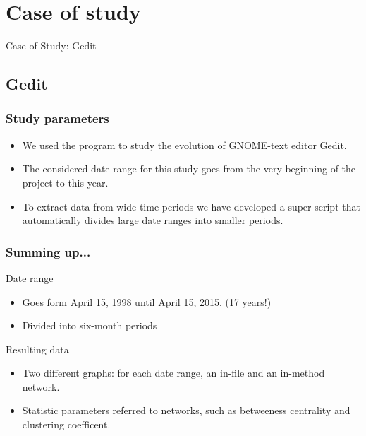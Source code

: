 \documentclass{beamer}
\begin{document}
\section{Case of study}
\begin{frame}
\Huge{\centerline{Case of Study: Gedit}}
\end{frame}
\subsection{Gedit}
\begin{frame}
\frametitle{Study parameters}
\begin{itemize}
\item We used the program to study the evolution of GNOME-text editor Gedit.
\item The considered date range for this study goes from the very beginning of the project to this year.
\item To extract data from wide time periods we have developed a super-script that automatically divides large date ranges into smaller periods.
\end{itemize}
\end{frame}


\begin{frame}
\frametitle{Summing up...}
\begin{block}{Date range}
\begin{itemize}
\item Goes form April 15, 1998 until April 15, 2015. (17 years!)
\item Divided into six-month periods
\end{itemize}
\end{block}

\begin{block}{Resulting data}
\begin{itemize}
\item Two different graphs: for each date range, 
an in-file and an in-method network.
\item Statistic parameters referred to networks, such as betweeness centrality and clustering coefficent.
\end{itemize}
\end{block}

\end{frame}
\end{document}
